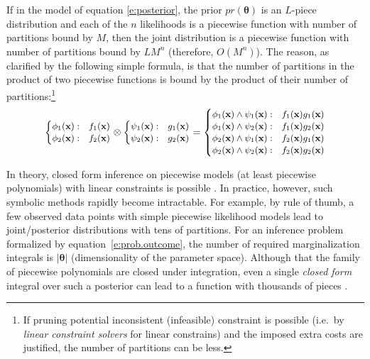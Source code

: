 


If in the model of equation \ref{e:posterior}, the prior $pr(\boldsymbol\theta)$ 
is an $L$-piece distribution and each of the $n$ likelihoods is a piecewise function with number of partitions  bound by $M$, 
then the joint distribution is a piecewise function with number of partitions bound by $LM^n$ (therefore, $O(M^n)$).
The reason, as clarified by the following simple formula,   
is that the number of partitions in the product of two piecewise functions is bound by the product of their number of partitions:\footnote{
If pruning potential inconsistent (infeasible) constraint is possible
(i.e.\ by \emph{linear constraint solvers} for linear constrains) and the imposed extra costs are justified,
the number of partitions can be less.
}%
\[
{\footnotesize
\begin{cases}
\phi_1(\bvec{x}) : & f_1(\bvec{x})\\
\phi_2(\bvec{x}) : & f_2(\bvec{x})
\end{cases}
\otimes
\begin{cases}
\psi_1(\bvec{x}) : & g_1(\bvec{x})\\
\psi_2(\bvec{x}) : & g_2(\bvec{x})
\end{cases}
=
\begin{cases}
\phi_1(\bvec{x}) \wedge \psi_1(\bvec{x}) : & f_1(\bvec{x}) g_1(\bvec{x})\\
\phi_1(\bvec{x}) \wedge \psi_2(\bvec{x}) : & f_1(\bvec{x}) g_2(\bvec{x})\\
\phi_2(\bvec{x}) \wedge \psi_1(\bvec{x}) : & f_2(\bvec{x}) g_1(\bvec{x})\\
\phi_2(\bvec{x}) \wedge \psi_2(\bvec{x}) : & f_2(\bvec{x}) g_2(\bvec{x})
\end{cases}
}%
\]

In theory, closed form inference on piecewise models (at least piecewise polynomials) with linear constraints is possible \cite{Sanner:12}.
In practice, however, such symbolic methods rapidly become intractable.
For example, by rule of thumb, a few observed data points with simple piecewise likelihood models lead to
joint/posterior distributions with tens of partitions.
For an inference problem formalized by equation~\ref{e:prob.outcome}, 
the number of required marginalization integrals is $|\boldsymbol\theta|$ (dimensionality of the parameter space).
Although that the family of piecewise polynomials are closed under integration, even a single \emph{closed form} integral over such a posterior can lead to a function with thousands of pieces \cite{Sanner:12}.   
   
